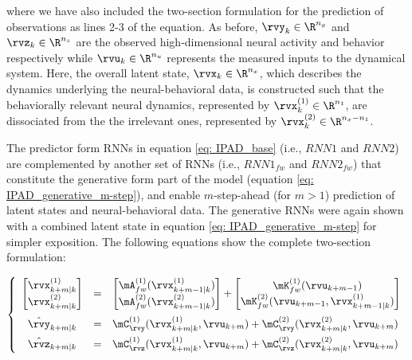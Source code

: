 \documentclass{article} %
\newcommand{\RNN}[1]{\(\textit{RNN#1}\)} %
\newcommand{\RNNfw}[1]{\(\textit{RNN#1}_{fw}\)}
\begin{document}
where we have also included the two-section formulation for the prediction of observations as lines 2-3 of the equation. As before, \(\rvy_{k} \in \R^{n_y}\) and \(\rvz_{k} \in \R^{n_z}\) are the observed high-dimensional neural activity and behavior respectively while \(\rvu_{k} \in \R^{n_u}\) represents the measured inputs to the dynamical system. Here, the overall latent state, \(\rvx_{k} \in \R^{n_x}\), which describes the dynamics underlying the neural-behavioral data, is constructed such that the behaviorally relevant neural dynamics, represented by \(\rvx_{k}^{(1)} \in \R^{n_1}\), are dissociated from the the irrelevant ones, represented by \(\rvx_{k}^{(2)} \in \R^{n_x-n_1}\). 

The predictor form RNNs in equation \ref{eq: IPAD_base} (i.e., \RNN1{} and \RNN2{}) are complemented by another set of RNNs (i.e., \RNNfw1{} and \RNNfw2{}) that constitute the generative form part of the model (equation \ref{eq: IPAD_generative_m-step}), and enable \(m\)-step-ahead (for \(m>1\)) prediction of latent states and neural-behavioral data. The generative RNNs were again shown with a combined latent state in equation \ref{eq: IPAD_generative_m-step} for simpler exposition. The following equations show the complete two-section formulation:

\begin{equation}\label{eq: IPAD_fw}
    \left\{%
    \begin{array}{ccl}
    \begin{bmatrix}
    \rvx_{k+m|k}^{(1)}\\
    \rvx_{k+m|k}^{(2)}
    \end{bmatrix}
    &=&
    \begin{bmatrix}
    \mA_{fw}^{(1)}(\rvx_{k+m-1|k}^{(1)})\\
    \mA_{fw}^{(2)}(\rvx_{k+m-1|k}^{(2)})
    \end{bmatrix}
    +
    \begin{bmatrix}
    \mK_{fw}^{(1)}(\rvu_{k+m-1})\\
    \mK_{fw}^{(2)}(\rvu_{k+m-1}, \rvx_{k+m-1|k}^{(1)})
    \end{bmatrix}
    \\[15pt] 
    \hat{\rvy}_{k+m|k} &=& \mC_{\rvy}^{(1)}(\rvx_{k+m|k}^{(1)}, \rvu_{k+m}) + \mC_{\rvy}^{(2)}(\rvx_{k+m|k}^{(2)}, \rvu_{k+m})\\[5pt] %
    \hat{\rvz}_{k+m|k} &=& \mC_{\rvz}^{(1)}(\rvx_{k+m|k}^{(1)}, \rvu_{k+m}) + \mC_{\rvz}^{(2)}(\rvx_{k+m|k}^{(2)}, \rvu_{k+m})
    
    \end{array}
    \right.
\end{equation}
\end{document}
